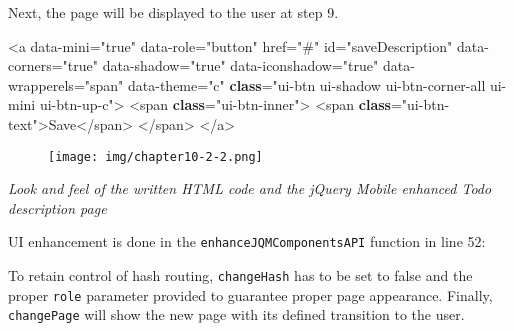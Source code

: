\documentclass[9pt]{book}
\newenvironment{Shaded}{}{}
\newcommand{\KeywordTok}[1]{\textcolor[rgb]{0.00,0.44,0.13}{\textbf{{#1}}}}
\newcommand{\DataTypeTok}[1]{\textcolor[rgb]{0.56,0.13,0.00}{{#1}}}
\newcommand{\StringTok}[1]{\textcolor[rgb]{0.25,0.44,0.63}{{#1}}}
\newcommand{\OtherTok}[1]{\textcolor[rgb]{0.00,0.44,0.13}{{#1}}}
\newcommand{\FunctionTok}[1]{\textcolor[rgb]{0.02,0.16,0.49}{{#1}}}
\newcommand{\NormalTok}[1]{{#1}}
\begin{document}
Next, the page will be displayed to the user at step 9.

\begin{Shaded}
\begin{Highlighting}[]
\NormalTok{<a data-mini=}\StringTok{"true"} \NormalTok{data-role=}\StringTok{"button"} \NormalTok{href=}\StringTok{"#"} \NormalTok{id=}\StringTok{"saveDescription"} \NormalTok{data-corners=}\StringTok{"true"} 
\NormalTok{data-shadow=}\StringTok{"true"} \NormalTok{data-iconshadow=}\StringTok{"true"} \NormalTok{data-wrapperels=}\StringTok{"span"} \NormalTok{data-theme=}\StringTok{"c"} 
\KeywordTok{class}\NormalTok{=}\StringTok{"ui-btn ui-shadow ui-btn-corner-all ui-mini ui-btn-up-c"}\NormalTok{>}
    \NormalTok{<span }\KeywordTok{class}\NormalTok{=}\StringTok{"ui-btn-inner"}\NormalTok{>}
         \NormalTok{<span }\KeywordTok{class}\NormalTok{=}\StringTok{"ui-btn-text"}\NormalTok{>Save<}\OtherTok{/span>}
\OtherTok{     </span}\NormalTok{>}
\NormalTok{<}\OtherTok{/a>}
\end{Highlighting}
\end{Shaded}

\begin{figure}[htbp]
\centering
\texttt{[image: img/chapter10-2-2.png]}
\end{figure}

\emph{Look and feel of the written HTML code and the jQuery Mobile
enhanced Todo description page}

UI enhancement is done in the \texttt{enhanceJQMComponentsAPI} function
in line 52:

\begin{Shaded}
\end{Shaded}

To retain control of hash routing, \texttt{changeHash} has to be set to
false and the proper \texttt{role} parameter provided to guarantee
proper page appearance. Finally, \texttt{changePage} will show the new
page with its defined transition to the user.
\end{document}
